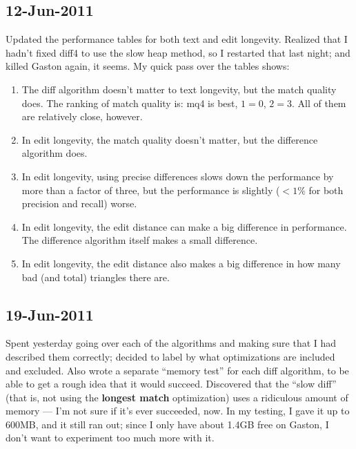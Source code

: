 \subsection{12-Jun-2011}

Updated the performance tables for both text and edit longevity.
Realized that I hadn't fixed diff4 to use the slow heap method,
so I restarted that last night; and killed Gaston again, it seems.
My quick pass over the tables shows:
\begin{enumerate}
\item The diff algorithm doesn't matter to text longevity, but
    the match quality does.  The ranking of match quality is:
    mq4 is best, $1 = 0$, $2 = 3$.  All of them are relatively
    close, however.
\item In edit longevity, the match quality doesn't matter, but
    the difference algorithm does.
\item In edit longevity, using precise differences slows down
    the performance by more than a factor of three,
    but the performance is slightly ($< 1\%$ for both
    precision and recall) worse.
\item In edit longevity, the edit distance can make a big
    difference in performance.  The difference algorithm itself
    makes a small difference.
\item In edit longevity, the edit distance also makes a big difference
    in how many bad (and total) triangles there are.
\end{enumerate}

\subsection{19-Jun-2011}

Spent yesterday going over each of the algorithms and making
sure that I had described them correctly; decided to label
by what optimizations are included and excluded.
Also wrote a separate ``memory test'' for each diff algorithm,
to be able to get a rough idea that it would succeed.
Discovered that the ``slow diff'' (that is, not using the
\textbf{longest match} optimization) uses a ridiculous amount
of memory --- I'm not sure if it's ever succeeded, now.
In my testing, I gave it up to 600MB, and it still ran out;
since I only have about 1.4GB free on Gaston, I don't want
to experiment too much more with it.

